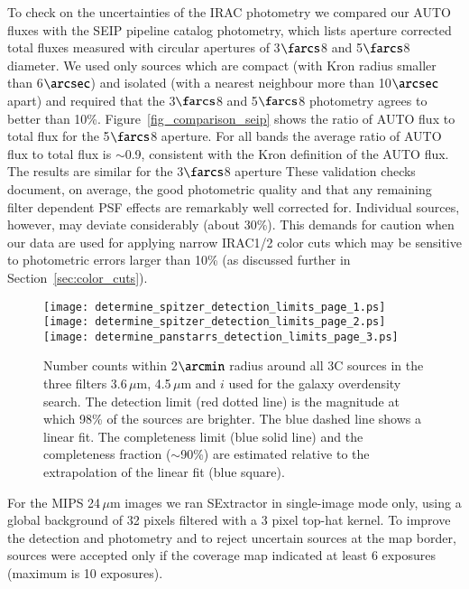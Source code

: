 \documentclass[mathleft,fleqn,%
]{an}
\begin{document}
To check on the uncertainties of the IRAC photometry we 
compared our AUTO fluxes with the SEIP pipeline
catalog photometry, which lists aperture corrected total fluxes
measured with circular  
apertures of 3$\farcs$8 and 5$\farcs$8 
diameter. 
We used only sources which are compact (with Kron radius smaller than
6$\arcsec$) and isolated (with a nearest neighbour more than
10$\arcsec$ apart) and required that the 3$\farcs$8 and 5$\farcs$8
photometry agrees to better than 10\%.
Figure~\ref{fig_comparison_seip} 
shows the ratio of 
AUTO flux to total flux  for the 5$\farcs$8 aperture.
For all bands the average ratio of 
AUTO flux to total flux is $\sim$0.9, 
consistent with the Kron definition of the AUTO flux.
The results are similar for the 3$\farcs$8 aperture
These validation checks document, on average, the good photometric
quality and that any remaining filter dependent PSF effects are
remarkably well corrected for. 
Individual sources, however, may deviate  
considerably (about 30\%).
This demands for caution when our data are used for applying narrow IRAC1/2
color cuts which 
may be sensitive to photometric errors larger than 10\%
(as discussed further in Section~\ref{sec:color_cuts}). 

\begin{figure*}
  \hspace{-5mm}\texttt{[image: determine\_spitzer\_detection\_limits\_page\_1.ps]}
  \hspace{-5mm}\texttt{[image: determine\_spitzer\_detection\_limits\_page\_2.ps]}
  \hspace{-5mm}\texttt{[image: determine\_panstarrs\_detection\_limits\_page\_3.ps]}
  \caption{ Number counts within 2$\arcmin$ radius around all 3C sources in the three filters
    3.6\,$\mu$m, 4.5\,$\mu$m and $i$ used for the galaxy overdensity search.
    The detection limit (red dotted line) is the magnitude at which 
    98\% of the sources are brighter. 
    The blue dashed line shows a linear fit.
    The completeness limit (blue solid line) and 
    the completeness fraction ($\sim$90\%) are estimated relative to the
    extrapolation of the linear fit (blue square).
  }
  \label{fig_detection_limits}
\end{figure*}

For the MIPS 24\,$\mu$m images we ran SExtractor in single-image mode
only, using a global background of 32 pixels filtered with a
3 pixel top-hat kernel. To improve the detection and
photometry  and to reject uncertain sources at the map border, 
sources were accepted only if the coverage map indicated at least 6
exposures (maximum is 10 exposures). 
\end{document}
